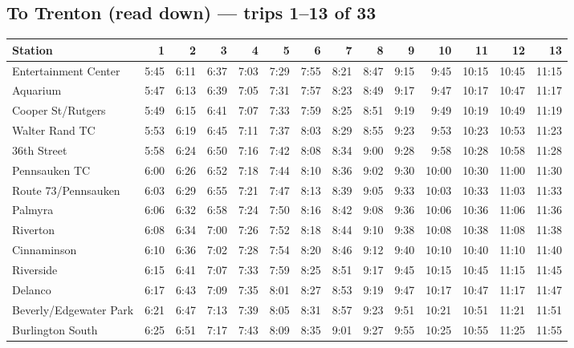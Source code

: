 \subsection*{To Trenton (read down) --- trips 1--13 of 33}
\begin{center}\footnotesize\setlength{\tabcolsep}{3pt}\begin{tabular}{@{}lrrrrrrrrrrrrr@{}}\toprule
Station & 1 & 2 & 3 & 4 & 5 & 6 & 7 & 8 & 9 & 10 & 11 & 12 & 13 \\\midrule
Entertainment Center & 5:45 & 6:11 & 6:37 & 7:03 & 7:29 & 7:55 & 8:21 & 8:47 & 9:15 & 9:45 & 10:15 & 10:45 & 11:15 \\
Aquarium & 5:47 & 6:13 & 6:39 & 7:05 & 7:31 & 7:57 & 8:23 & 8:49 & 9:17 & 9:47 & 10:17 & 10:47 & 11:17 \\
Cooper St/Rutgers & 5:49 & 6:15 & 6:41 & 7:07 & 7:33 & 7:59 & 8:25 & 8:51 & 9:19 & 9:49 & 10:19 & 10:49 & 11:19 \\
Walter Rand TC & 5:53 & 6:19 & 6:45 & 7:11 & 7:37 & 8:03 & 8:29 & 8:55 & 9:23 & 9:53 & 10:23 & 10:53 & 11:23 \\
36th Street & 5:58 & 6:24 & 6:50 & 7:16 & 7:42 & 8:08 & 8:34 & 9:00 & 9:28 & 9:58 & 10:28 & 10:58 & 11:28 \\
Pennsauken TC & 6:00 & 6:26 & 6:52 & 7:18 & 7:44 & 8:10 & 8:36 & 9:02 & 9:30 & 10:00 & 10:30 & 11:00 & 11:30 \\
Route 73/Pennsauken & 6:03 & 6:29 & 6:55 & 7:21 & 7:47 & 8:13 & 8:39 & 9:05 & 9:33 & 10:03 & 10:33 & 11:03 & 11:33 \\
Palmyra & 6:06 & 6:32 & 6:58 & 7:24 & 7:50 & 8:16 & 8:42 & 9:08 & 9:36 & 10:06 & 10:36 & 11:06 & 11:36 \\
Riverton & 6:08 & 6:34 & 7:00 & 7:26 & 7:52 & 8:18 & 8:44 & 9:10 & 9:38 & 10:08 & 10:38 & 11:08 & 11:38 \\
Cinnaminson & 6:10 & 6:36 & 7:02 & 7:28 & 7:54 & 8:20 & 8:46 & 9:12 & 9:40 & 10:10 & 10:40 & 11:10 & 11:40 \\
Riverside & 6:15 & 6:41 & 7:07 & 7:33 & 7:59 & 8:25 & 8:51 & 9:17 & 9:45 & 10:15 & 10:45 & 11:15 & 11:45 \\
Delanco & 6:17 & 6:43 & 7:09 & 7:35 & 8:01 & 8:27 & 8:53 & 9:19 & 9:47 & 10:17 & 10:47 & 11:17 & 11:47 \\
Beverly/Edgewater Park & 6:21 & 6:47 & 7:13 & 7:39 & 8:05 & 8:31 & 8:57 & 9:23 & 9:51 & 10:21 & 10:51 & 11:21 & 11:51 \\
Burlington South & 6:25 & 6:51 & 7:17 & 7:43 & 8:09 & 8:35 & 9:01 & 9:27 & 9:55 & 10:25 & 10:55 & 11:25 & 11:55 \\

\end{tabular}
\end{center}
